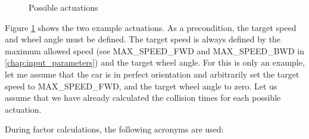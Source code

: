 \begin{figure}[!ht]
    \centering
    \caption{Possible actuations}
    \label{possible_actuations}
\end{figure}

Figure \ref{possible_actuations} shows the two example actuations. As a precondition, the target speed and wheel angle must be defined. The target speed is always defined by the maximum allowed speed (see MAX\_SPEED\_FWD and MAX\_SPEED\_BWD in \ref{chap:input_parameters}) and the target wheel angle. For this is only an example, let me assume that the car is in perfect orientation and arbitrarily set the target speed to MAX\_SPEED\_FWD, and the target wheel angle to zero. Let us assume that we have already calculated the collision times for each possible actuation.

During factor calculations, the following acronyms are used:

